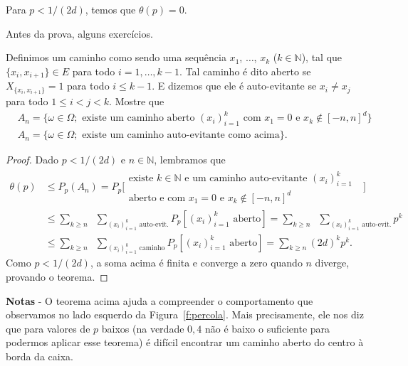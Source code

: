 \begin{topics}
\begin{theorem}
  Para $p < 1/(2d)$, temos que $\theta(p) = 0$.
\end{theorem}

Antes da prova, alguns exercícios.

\begin{exercise}
  Definimos um caminho como sendo uma sequência $x_1$, $\dots$, $x_k$ ($k \in \mathbb{N}$), tal que $\{x_i, x_{i+1}\} \in E$ para todo $i = 1, \dots, k-1$.
  Tal caminho é dito aberto se $X_{\{x_i, x_{i+1}\}} = 1$ para todo $i \leq k-1$.
  E dizemos que ele é auto-evitante se $x_i \neq x_j$ para todo $1 \leq i < j < k$.
  Mostre que
  \begin{equation*}
    \begin{split}
      & A_n = \Big\{ \omega \in \Omega; \text{ existe um caminho aberto $(x_i)_{i=1}^{k}$ com $x_1 = 0$ e $x_k \not \in [-n, n]^d$} \Big\}\\
      & A_n = \big\{ \omega \in \Omega; \text{ existe um caminho auto-evitante como acima} \big\}.
    \end{split}
  \end{equation*}
\end{exercise}

\begin{proof}
  Dado $p < 1/(2d)$ e $n \in \mathbb{N}$, lembramos que
  \begin{equation*}
    \begin{split}
      \theta(p) & \leq P_p(A_n) = P_p \Big[
      \begin{array}{c}
      \text{existe $k \in \mathbb{N}$ e um caminho auto-evitante $(x_i)_{i=1}^k$ }\\
      \text{aberto e com $x_1 = 0$ e $x_k \not \in [-n, n]^d$}
    \end{array} \Big]\\[2mm]
    & \leq \sum_{k \geq n} \; \; \sum_{(x_i)_{i=1}^k \text{ auto-evit.}} P_p [(x_i)_{i=1}^k \text{ aberto}] = \sum_{k \geq n} \; \; \sum_{(x_i)_{i=1}^k \text{ auto-evit.}} p^k\\
    & \leq \sum_{k \geq n} \; \; \sum_{(x_i)_{i=1}^k \text{ caminho}} P_p [(x_i)_{i=1}^k \text{ aberto}] = \sum_{k \geq n} (2d)^k p^k.
    \end{split}
  \end{equation*}
  Como $p < 1/(2d)$, a soma acima é finita e converge a zero quando $n$ diverge, provando o teorema.
\end{proof}

{\bf Notas} - O teorema acima ajuda a compreender o comportamento que observamos no lado esquerdo da Figura~\ref{f:percola}.
Mais precisamente, ele nos diz que para valores de $p$ baixos (na verdade $0,4$ não é baixo o suficiente para podermos aplicar esse teorema) é difícil encontrar um caminho aberto do centro à borda da caixa.


\end{topics}
